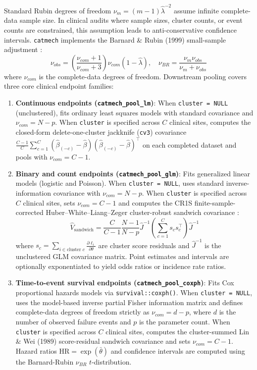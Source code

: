 \documentclass[
]{article}
\providecommand{\tightlist}{%
  \setlength{\itemsep}{0pt}\setlength{\parskip}{0pt}}
\begin{document}
Standard Rubin degrees of freedom \(\nu_m = (m - 1) \hat{\lambda}^{-2}\)
assume infinite complete-data sample size. In clinical audits where
sample sizes, cluster counts, or event counts are constrained, this
assumption leads to anti-conservative confidence intervals.
\texttt{catmech} implements the Barnard \& Rubin (1999) small-sample
adjustment \citep{barnard1999small}:
\[\nu_{obs} = \left(\frac{\nu_{com} + 1}{\nu_{com} + 3}\right) \nu_{com} (1 - \hat{\lambda}), \quad \nu_{BR} = \frac{\nu_m \nu_{obs}}{\nu_m + \nu_{obs}}\]
where \(\nu_{com}\) is the complete-data degrees of freedom. Downstream
pooling covers three core clinical endpoint families:

\begin{enumerate}
\def\labelenumi{\arabic{enumi}.}
\tightlist
\item
  \textbf{Continuous endpoints (\texttt{catmech\_pool\_lm})}: When
  \texttt{cluster\ =\ NULL} (unclustered), fits ordinary least squares
  models with standard covariance and \(\nu_{com} = N - p\). When
  \texttt{cluster} is specified across \(C\) clinical sites, computes
  the closed-form delete-one-cluster jackknife (\texttt{cv3}) covariance
  \(\frac{C - 1}{C} \sum_{c=1}^C (\hat{\beta}_{(-c)} - \hat{\beta})(\hat{\beta}_{(-c)} - \hat{\beta})^\top\)
  on each completed dataset and pools with \(\nu_{com} = C - 1\).
\item
  \textbf{Binary and count endpoints (\texttt{catmech\_pool\_glm})}:
  Fits generalized linear models (logistic and Poisson). When
  \texttt{cluster\ =\ NULL}, uses standard inverse-information
  covariance with \(\nu_{com} = N - p\). When \texttt{cluster} is
  specified across \(C\) clinical sites, sets \(\nu_{com} = C - 1\) and
  computes the CR1S finite-sample-corrected Huber--White--Liang--Zeger
  cluster-robust sandwich covariance \citep{liang1986longitudinal}:
  \[\hat{V}_{\text{sandwich}} = \frac{C}{C - 1}\frac{N - 1}{N - p} \hat{J}^{-1} \left(\sum_{c=1}^C s_c s_c^\top\right) \hat{J}^{-1}\]
  where
  \(s_c = \sum_{i \in \text{cluster } c} \frac{\partial \ell_i}{\partial \theta}\)
  are cluster score residuals and \(\hat{J}^{-1}\) is the unclustered
  GLM covariance matrix. Point estimates and intervals are optionally
  exponentiated to yield odds ratios or incidence rate ratios.
\item
  \textbf{Time-to-event survival endpoints
  (\texttt{catmech\_pool\_coxph})}: Fits Cox proportional hazards models
  via \texttt{survival::coxph()}. When \texttt{cluster\ =\ NULL}, uses
  the model-based inverse partial Fisher information matrix and defines
  complete-data degrees of freedom strictly as \(\nu_{com} = d - p\),
  where \(d\) is the number of observed failure events and \(p\) is the
  parameter count. When \texttt{cluster} is specified across \(C\)
  clinical sites, computes the cluster-summed Lin \& Wei (1989)
  score-residual sandwich covariance \citep{lin1989robust} and sets
  \(\nu_{com} = C - 1\). Hazard ratios
  \(\text{HR} = \exp(\bar{\theta})\) and confidence intervals are
  computed using the Barnard-Rubin \(\nu_{BR}\) \(t\)-distribution.
\end{enumerate}
\end{document}
